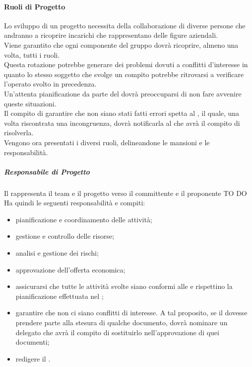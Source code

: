 			\paragraph{Ruoli di Progetto}
			Lo sviluppo di un progetto necessita della collaborazione di diverse persone che andranno a ricoprire incarichi che rappresentano delle figure aziendali. \\
			Viene garantito che ogni componente del gruppo \groupName{} dovrà ricoprire, almeno una volta, tutti i ruoli. \\
			Questa rotazione potrebbe generare dei problemi dovuti a conflitti d'interesse in quanto lo stesso soggetto che svolge un compito potrebbe ritrovarsi a verificare l'operato svolto in precedenza. \\
			Un'attenta pianificazione da parte del \roleProjectManager{} dovrà preoccuparsi di non fare avvenire queste situazioni. \\
			Il compito di garantire che non siano stati fatti errori spetta al \roleVerifier, il quale, una volta riscontrata una incongruenza, dovrà notificarla al \roleProjectManager{} che avrà il compito di risolverla. \\ 
			Vengono ora presentati i diversi ruoli, delineandone le mansioni e le responsabilità.
				\subparagraph{Responsabile di Progetto}
				Il \roleProjectManager{} rappresenta il team e il progetto verso il committente e il proponente TO DO \\
				Ha quindi le seguenti responsabilità e compiti:
					\begin{itemize}
						\item pianificazione e coordinamento delle attività;
						\item gestione e controllo delle risorse;
						\item analisi e gestione dei rischi;
						\item approvazione dell'offerta economica;
						\item assicurarsi che tutte le attività svolte siano conformi alle \docNameVersionNdP{} e rispettino la pianificazione effettuata nel \docNameVersionPdP;
						\item garantire che non ci siano conflitti di interesse. A tal proposito, se il \roleProjectManager{} dovesse prendere parte alla stesura di qualche documento, dovrà nominare un \roleProjectManager delegato che avrà il compito di sostituirlo nell'approvazione di quei documenti;
						\item redigere il \docNameVersionPdP.
					\end{itemize}
					
